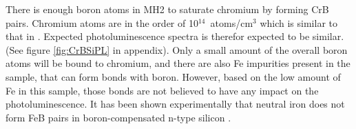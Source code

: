 There is enough boron atoms in MH2 to saturate chromium by forming CrB pairs. Chromium atoms are in the order of 10$^{14}$~atoms/cm$^3$ which is similar to that in \cite{conzelmann82}. Expected photoluminescence spectra is therefor expected to be similar. (See figure \ref{fig:CrBSiPL} in appendix). Only a small amount of the overall boron atoms will be bound to chromium, and there are also Fe impurities present in the sample, that can form bonds with boron. However, based on the low amount of Fe in this sample, those bonds are not believed to have any impact on the photoluminescence. It has been shown experimentally that neutral iron does not form FeB pairs in boron-compensated n-type silicon \cite{lemke81}.

